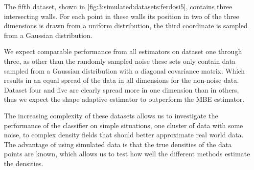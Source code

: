 	The fifth dataset, shown in \cref{fig:3:simulated:datasets:ferdosi5}, contains three intersecting walls. For each point in these walls its position in two of the three dimensions is drawn from a uniform distribution, the third coordinate is sampled from a Gaussian distribution.


We expect comparable performance from all estimators on dataset one through three, as other than the randomly sampled noise these sets only contain data sampled from a Gaussian distribution with a diagonal covariance matrix. Which results in an equal spread of the data in all dimensions for the non-noise data. Dataset four and five are clearly spread more in one dimension than in others, thus we expect the shape adaptive estimator to outperform the MBE estimator.

The increasing complexity of these datasets allows us to investigate the performance of the classifier on simple situations, one cluster of data with some noise, to complex density fields that should better approximate real world data. The advantage of using simulated data is that the true densities of the data points are known, which allows us to test how well the different methods estimate the densities.